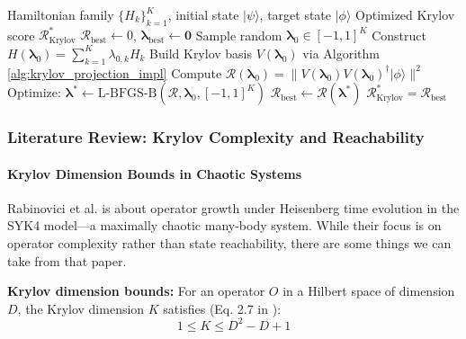 \documentclass[ a4paper, 
                amsfonts, 
                amssymb, 
                amsmath, 
                reprint, 
                showkeys, 
                nofootinbib,
                superscriptaddress, 
                onecolumn, 
                notitlepage,
                aps,
                pra,
                longbibliography]{revtex4-1}
\theoremstyle{definition}
\begin{document}
\begin{algorithm}[H]
\caption{Parameter-Optimized Continuous Krylov Score}
\label{alg:krylov_optimized}
\begin{algorithmic}[1]
\REQUIRE Hamiltonian family $\{H_k\}_{k=1}^K$, initial state $|\psi\rangle$, target state $|\phi\rangle$
\ENSURE Optimized Krylov score $\mathcal{R}^*_{\text{Krylov}}$
\STATE $\mathcal{R}_{\text{best}} \leftarrow 0$, $\boldsymbol{\lambda}_{\text{best}} \leftarrow \mathbf{0}$
    \STATE Sample random $\boldsymbol{\lambda}_0 \in [-1,1]^K$
    \STATE Construct $H(\boldsymbol{\lambda}_0) = \sum_{k=1}^K \lambda_{0,k} H_k$
    \STATE Build Krylov basis $V(\boldsymbol{\lambda}_0)$ via Algorithm \ref{alg:krylov_projection_impl}
    \STATE Compute $\mathcal{R}(\boldsymbol{\lambda}_0) = \|V(\boldsymbol{\lambda}_0) V(\boldsymbol{\lambda}_0)^\dagger |\phi\rangle\|^2$
    \STATE Optimize: $\boldsymbol{\lambda}^* \leftarrow \text{L-BFGS-B}(\mathcal{R}, \boldsymbol{\lambda}_0, [-1,1]^K)$ 
        \STATE $\mathcal{R}_{\text{best}} \leftarrow \mathcal{R}(\boldsymbol{\lambda}^*)$
    \ENDIF
\ENDFOR
\RETURN $\mathcal{R}^*_{\text{Krylov}} = \mathcal{R}_{\text{best}}$
\end{algorithmic}
\end{algorithm}

\subsubsection{Literature Review: Krylov Complexity and Reachability}

\paragraph{Krylov Dimension Bounds in Chaotic Systems}

Rabinovici et al. \cite{Rabinovici_2021} is about operator growth under Heisenberg time evolution in the SYK4 model—a maximally chaotic many-body system. While their focus is on operator complexity rather than state reachability, there are some things we can take from that paper.


\textbf{Krylov dimension bounds:} For an operator $O$ in a Hilbert space of dimension $D$, the Krylov dimension $K$ satisfies (Eq. 2.7 in \cite{Rabinovici_2021}):
\begin{equation}
1 \leq K \leq D^2 - D + 1
\end{equation}
\end{document}
